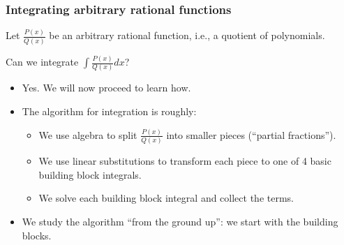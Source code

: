 \begin{frame}
\frametitle{Integrating arbitrary rational functions}
Let $\frac{P(x)}{Q(x)}$ be an arbitrary rational function, i.e., a quotient of polynomials.
\begin{question}
Can we integrate $\displaystyle\int \frac{P(x)}{Q(x)}dx$?
\end{question}
\begin{itemize}
\item Yes. We will now proceed to learn how.
\item The algorithm for integration is roughly:
\begin{itemize}
\item We use algebra to split $\frac{P(x)}{Q(x)}$ into smaller pieces (``partial fractions''). 
\item We use linear substitutions to transform each piece to one of 4 basic building block integrals.
\item We solve each building block integral and collect the terms.
\end{itemize}
\item We study the algorithm ``from the ground up'': we start with the building blocks.
\end{itemize}
\end{frame}

